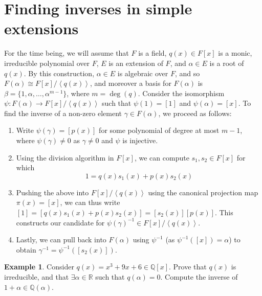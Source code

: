 \documentclass[11pt]{article}
\def\mbb{\mathbb}
\def\R{\mbb{R}}
\def\Q{\mbb{Q}}
\def\E{\exists}
\def\vs{\vspace{5mm}}
\newcommand{\Ang}[1]{\left\langle #1 \right\rangle}
\theoremstyle{pink}
\theoremstyle{boxedsolution}
\theoremstyle{definition}
\newtheorem{example}[definition]{Example}
\theoremstyle{claim}
\begin{document}
\section{Finding inverses in simple extensions}

For the time being, we will assume that $F$ is a field, $q(x) \in F[x]$ is a monic, irreducible polynomial over $F$, $E$ is an extension of $F$, and $\alpha \in E$ is a root of $q(x)$. By this construction, $\alpha \in E$ is algebraic over $F$, and so $F(\alpha) \cong F[x] / \Ang{q(x)}$, and moreover a basis for $F(\alpha)$ is $\beta = \{1, \alpha, \dots, \alpha^{m-1}\}$, where $m=\deg(q)$. Consider the isomorphism $\psi: F(\alpha) \to F[x]/\Ang{q(x)}$ such that $\psi(1) = [1]$ and $\psi(\alpha) = [x]$. To find the inverse of a non-zero element $\gamma \in F(\alpha)$, we proceed as follows:
\begin{enumerate}
    \item Write $\psi(\gamma) = [p(x)]$ for some polynomial of degree at most $m-1$, where $\psi(\gamma) \neq 0$ as $\gamma \neq 0$ and $\psi$ is injective.

    \item Using the division algorithm in $F[x]$, we can compute $s_1, s_2 \in F[x]$ for which 
    \[
    1 = q(x)s_1(x) + p(x)s_2(x)
    \]

    \item Pushing the above into $F[x]/\Ang{q(x)}$ using the canonical projection map $\pi(x) = [x]$, we can thus write $[1] = [q(x)s_1(x) + p(x)s_2(x)] = [s_2(x)][p(x)]$. This constructs our candidate for $\psi(\gamma)^{-1} \in F[x]/\Ang{q(x)}$. 

    \item Lastly, we can pull back into $F(\alpha)$ using $\psi^{-1}$ (as $\psi^{-1}([x]) = \alpha$) to obtain $\gamma^{-1} = \psi^{-1}([s_2(x)])$.
\end{enumerate}

\vs

\begin{example}
Consider $q(x) = x^3+9x+6 \in \Q[x]$. Prove that $q(x)$ is irreducible, and that $\E \alpha \in \R$ such that $q(\alpha) = 0$. Compute the inverse of $1 + \alpha \in \Q(\alpha)$.
\end{example}
\end{document}
